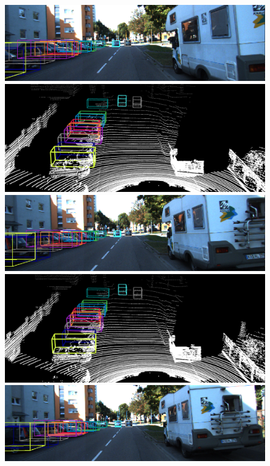 \documentclass{bmvc2k}
\begin{document}
\begin{figure}
{\begin{minipage}[b]{0.5\linewidth}
	\includegraphics[width=0.95\linewidth]{images/supplementary/12/img/04.png}\vspace{1.5pt}
	\includegraphics[width=0.95\linewidth]{images/supplementary/12/pc/03.png}\vspace{1pt}
	\includegraphics[width=0.95\linewidth]{images/supplementary/12/img/03.png}\vspace{1.5pt}
	\includegraphics[width=0.95\linewidth]{images/supplementary/12/pc/02.png}\vspace{1pt}
	\includegraphics[width=0.95\linewidth]{images/supplementary/12/img/02.png}\vspace{1.5pt}

\end{minipage}}
\end{figure}
\end{document}
